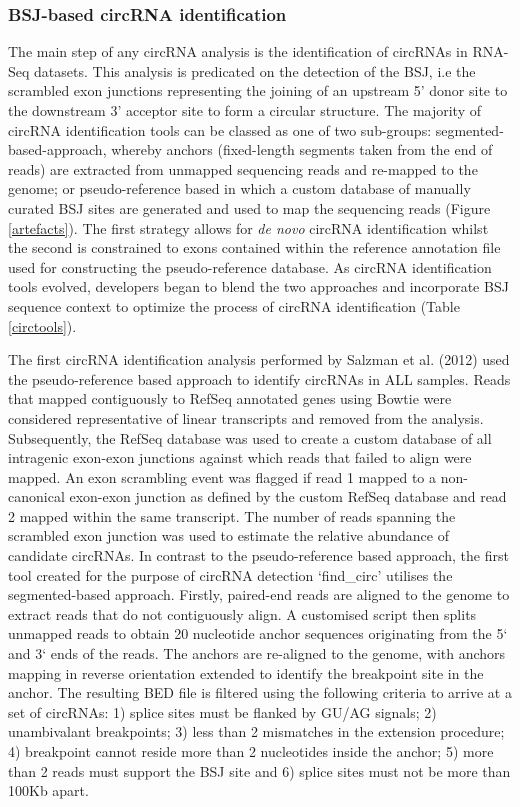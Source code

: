 \subsubsection{BSJ-based circRNA identification}
The main step of any circRNA analysis is the identification of circRNAs in RNA-Seq datasets. This analysis is predicated on the detection of the BSJ, i.e the scrambled exon junctions representing the joining of an upstream 5' donor site to the downstream 3' acceptor site to form a circular structure. The majority of circRNA identification tools can be classed as one of two sub-groups: segmented-based-approach, whereby anchors (fixed-length segments taken from the end of reads) are extracted from unmapped sequencing reads and re-mapped to the genome; or pseudo-reference based in which a custom database of manually curated BSJ sites are generated and used to map the sequencing reads (Figure \ref{artefacts}). The first strategy allows for \textit{de novo} circRNA identification whilst the second is constrained to exons contained within the reference annotation file used for constructing the pseudo-reference database. As circRNA identification tools evolved, developers began to blend the two approaches and incorporate BSJ sequence context to optimize the process of circRNA identification (Table \ref{circtools}). \par
The first circRNA identification analysis performed by Salzman et al. (2012) \cite{Salzman2012} used the pseudo-reference based approach to identify circRNAs in ALL samples. Reads that mapped contiguously to RefSeq annotated genes using Bowtie \cite{Bowtie} were considered representative of linear transcripts and removed from the analysis. Subsequently, the RefSeq database was used to create a custom database of all intragenic exon-exon junctions against which reads that failed to align were mapped. An exon scrambling event was flagged if read 1 mapped to a non-canonical exon-exon junction as defined by the custom RefSeq database and read 2 mapped within the same transcript. The number of reads spanning the scrambled exon junction was used to estimate the relative abundance of candidate circRNAs. In contrast to the pseudo-reference based approach, the first tool created for the purpose of circRNA detection `find\_circ' \cite{findcirc} utilises the segmented-based approach. Firstly, paired-end reads are aligned to the genome to extract reads that do not contiguously align. A customised script then splits unmapped reads to obtain 20 nucleotide anchor sequences originating from the 5` and 3` ends of the reads. The anchors are re-aligned to the genome, with anchors mapping in reverse orientation extended to identify the breakpoint site in the anchor. The resulting BED file is filtered using the following criteria to arrive at a set of circRNAs: 1) splice sites must be flanked by GU/AG signals; 2) unambivalant breakpoints; 3) less than 2 mismatches in the extension procedure; 4) breakpoint cannot reside more than 2 nucleotides inside the anchor; 5) more than 2 reads must support the BSJ site and 6) splice sites must not be more than 100Kb apart. \par
